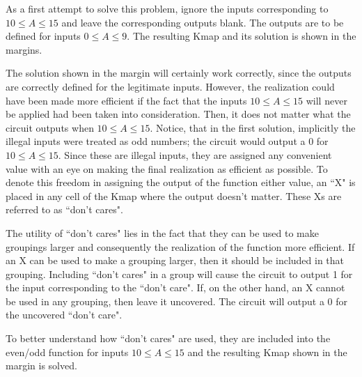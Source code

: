 \begin{process:minimizationKmap}
As a first attempt to solve this problem, ignore the inputs 
corresponding to $10 \le A \le 15$ and leave the 
corresponding outputs blank.  The outputs are to be defined
for inputs $0 \le A \le 9$. The resulting Kmap and its solution
is shown in the margins.


The solution shown in the margin will certainly work correctly,
since the outputs are correctly defined for the legitimate inputs.
However, the realization could have been made more efficient
if the fact that the inputs $10 \le A \le 15$ will never be applied 
had been taken into consideration. Then, it does not matter what the 
circuit outputs when $10 \le A \le 15$.  Notice, that in the first 
solution, implicitly
the illegal inputs were treated as odd numbers; the circuit would
output a 0 for $10 \le A \le 15$. Since these are illegal inputs,
they are assigned any convenient value with an eye on making 
the final realization as
efficient as possible.  To denote this freedom in assigning the
output of the function either value, an ``X" is placed in any 
cell of the Kmap where the output doesn't matter.  These
Xs are referred to as ``don't cares".

The utility of ``don't cares" lies in the fact that they can be 
used to make groupings larger and consequently the realization
of the function more efficient.  If an X can be used to make a 
grouping larger, then it should be included in that grouping.
Including ``don't cares" in a group will cause the circuit to
output 1 for the input corresponding to the ``don't care".  
If, on the other hand,
an X cannot be used in any grouping, then leave it uncovered.
The circuit will output a 0 for the uncovered ``don't care".

To better understand how ``don't cares" are used, they are included
into the even/odd function for inputs $10 \le A \le 15$ and the
resulting Kmap shown in the margin is solved.


\end{process:minimizationKmap}
